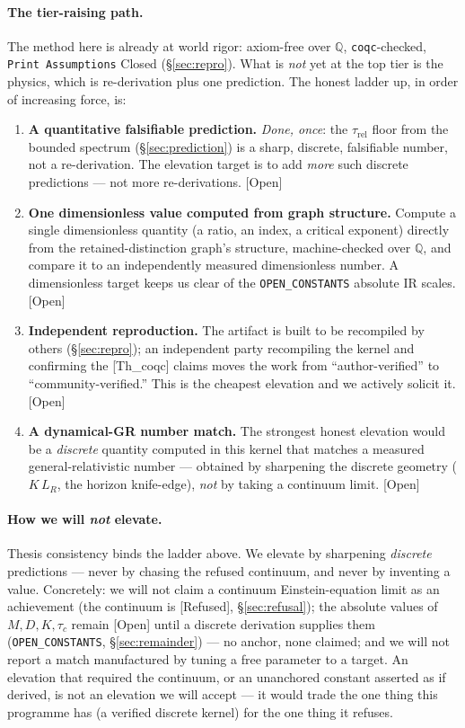 \documentclass[10pt,twocolumn]{article}
\theoremstyle{definition}
\newcommand{\Thq}{\textsf{[Th\_coqc]}}
\newcommand{\Open}{\textsf{[Open]}}
\newcommand{\Refu}{\textsf{[Refused]}}
\newcommand{\code}[1]{\texttt{#1}}
\newcommand{\LR}{L_{R}}
\begin{document}
\paragraph{The tier-raising path.} The method here is already at world rigor: axiom-free
over $\mathbb{Q}$, \code{coqc}-checked, \code{Print Assumptions} Closed (\S\ref{sec:repro}).
What is \emph{not} yet at the top tier is the physics, which is re-derivation plus one
prediction. The honest ladder up, in order of increasing force, is:
\begin{enumerate}\itemsep2pt
\item \textbf{A quantitative falsifiable prediction.} \emph{Done, once}: the $\tau_{\mathrm{rel}}$ floor
  from the bounded spectrum (\S\ref{sec:prediction}) is a sharp, discrete,
  falsifiable number, not a re-derivation. The elevation target is to add \emph{more} such
  discrete predictions --- not more re-derivations. \Open{}
\item \textbf{One dimensionless value computed from graph structure.} Compute a single
  dimensionless quantity (a ratio, an index, a critical exponent) directly from the
  retained-distinction graph's structure, machine-checked over $\mathbb{Q}$, and compare it
  to an independently measured dimensionless number. A dimensionless target keeps us clear
  of the \code{OPEN\_CONSTANTS} absolute IR scales. \Open{}
\item \textbf{Independent reproduction.} The artifact is built to be recompiled by others
  (\S\ref{sec:repro}); an independent party recompiling the kernel and confirming the
  \Thq{} claims moves the work from ``author-verified'' to ``community-verified.'' This is
  the cheapest elevation and we actively solicit it. \Open{}
\item \textbf{A dynamical-GR number match.} The strongest honest elevation would be a
  \emph{discrete} quantity computed in this kernel that matches a measured
  general-relativistic number --- obtained by sharpening the discrete geometry
  ($K\,\LR$, the horizon knife-edge), \emph{not} by taking a continuum limit. \Open{}
\end{enumerate}

\paragraph{How we will \emph{not} elevate.} Thesis consistency binds the ladder above. We
elevate by sharpening \emph{discrete} predictions --- never by chasing the refused
continuum, and never by inventing a value. Concretely: we will not claim a continuum
Einstein-equation limit as an achievement (the continuum is \Refu{}, \S\ref{sec:refusal});
the absolute values of $M,D,K,\tau_c$ remain \Open{} until a discrete derivation supplies
them (\code{OPEN\_CONSTANTS}, \S\ref{sec:remainder}) --- no anchor, none claimed; and we
will not report a match manufactured by tuning a free parameter to a target. An elevation
that required the continuum, or an unanchored constant asserted as if derived, is not an
elevation we will accept --- it would trade the one thing this programme has (a verified
discrete kernel) for the one thing it refuses.
\end{document}
